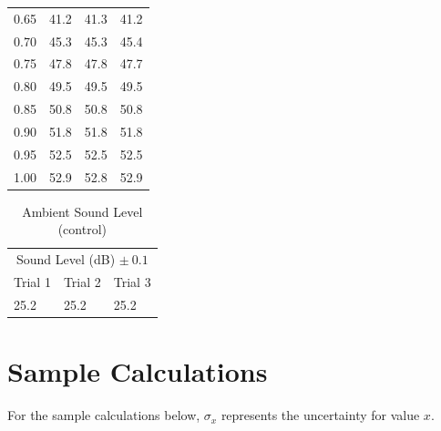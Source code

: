 \documentclass[index]{subfiles}
\begin{document}
\begin{table}[H]
\begin{tabular}{@{}cccc@{}}
        0.65                                 & 41.2                                              & 41.3    & 41.2    \\
        0.70                                 & 45.3                                              & 45.3    & 45.4    \\
        0.75                                 & 47.8                                              & 47.8    & 47.7    \\
        0.80                                 & 49.5                                              & 49.5    & 49.5    \\
        0.85                                 & 50.8                                              & 50.8    & 50.8    \\
        0.90                                 & 51.8                                              & 51.8    & 51.8    \\
        0.95                                 & 52.5                                              & 52.5    & 52.5    \\
        1.00                                 & 52.9                                              & 52.8    & 52.9    \\
    \end{tabular}
\end{table}

\begin{table}[H]
    \caption{Ambient Sound Level (control)}
    \centering
    \begin{tabular}{@{}lll@{}} \toprule
        \multicolumn{3}{c}{Sound Level (dB) \(\pm\ 0.1\) } \\ \cmidrule(r){1-3}
        Trial 1 & Trial 2 & Trial 3                        \\ \midrule
        25.2    & 25.2    & 25.2
    \end{tabular}

\end{table}

\section{Sample Calculations}

For the sample calculations below, \(\sigma_x\) represents the uncertainty for value \(x\).
\end{document}

